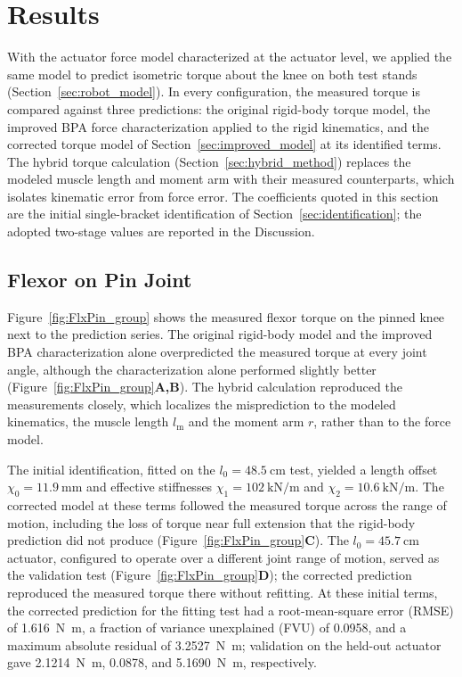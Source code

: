 \section{Results}\label{sec:results_torque}

With the actuator force model characterized at the actuator level, we applied the same model to predict isometric torque about the knee on both test stands (Section~\ref{sec:robot_model}). In every configuration, the measured torque is compared against three predictions: the original rigid-body torque model, the improved BPA force characterization applied to the rigid kinematics, and the corrected torque model of Section~\ref{sec:improved_model} at its identified terms. The hybrid torque calculation (Section~\ref{sec:hybrid_method}) replaces the modeled muscle length and moment arm with their measured counterparts, which isolates kinematic error from force error. The coefficients quoted in this section are the initial single-bracket identification of Section~\ref{sec:identification}; the adopted two-stage values are reported in the Discussion.

\subsection{Flexor on Pin Joint}

Figure~\ref{fig:FlxPin_group} shows the measured flexor torque on the pinned knee next to the prediction series. The original rigid-body model and the improved BPA characterization alone overpredicted the measured torque at every joint angle, although the characterization alone performed slightly better (Figure~\ref{fig:FlxPin_group}\textbf{A,B}). The hybrid calculation reproduced the measurements closely, which localizes the misprediction to the modeled kinematics, the muscle length $l_\text{m}$ and the moment arm $r$, rather than to the force model.

The initial identification, fitted on the $l_{0}=\qty{48.5}{\cm}$ test, yielded a length offset $\chi_{0} = \qty{11.9}{\mm}$ and effective stiffnesses $\chi_{1} = \qty{102}{\kilo\newton\per\meter}$ and $\chi_{2} = \qty{10.6}{\kilo\newton\per\meter}$. The corrected model at these terms followed the measured torque across the range of motion, including the loss of torque near full extension that the rigid-body prediction did not produce (Figure~\ref{fig:FlxPin_group}\textbf{C}). The $l_{0}=\qty{45.7}{\cm}$ actuator, configured to operate over a different joint range of motion, served as the validation test (Figure~\ref{fig:FlxPin_group}\textbf{D}); the corrected prediction reproduced the measured torque there without refitting. At these initial terms, the corrected prediction for the fitting test had a root-mean-square error (RMSE) of \qty{1.616}{\newton\meter}, a fraction of variance unexplained (FVU) of 0.0958, and a maximum absolute residual of \qty{3.2527}{\newton\meter}; validation on the held-out actuator gave \qty{2.1214}{\newton\meter}, 0.0878, and \qty{5.1690}{\newton\meter}, respectively.

